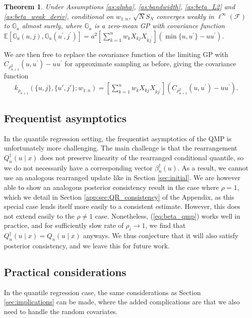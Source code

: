 \documentclass[11pt,a4paper]{article}
\newtheorem{theorem}{Theorem}%
\newcommand{\E}{\mathbb{E}}
\begin{document}
\begin{theorem}\label{th:reg_gp}
   Under {Assumptions \ref{as:alpha}}, {\ref{as:bandwidth}},  {\ref{as:beta_L2}} and {\ref{as:beta_weak_deriv}}, conditional on $w_{1:n}$, $\sqrt{N}S_{N}$ converges weakly in $\ell^{\infty}(\mathcal{F})$ to $\mathbb{G}_{a}$ almost surely, where $\mathbb{G}_{a}$ is a zero-mean GP with covariance function
    $\E[\mathbb{G}_{a}(u,j), \mathbb{G}_{a}(u^{\prime}, j^{\prime})] = a^{2}\left[\sum_{k=1}^{n}w_{k}X_{kj}X_{kj^{\prime}}\right](\min\{u,u^{\prime}\} - uu^{\prime})$.
\end{theorem}
We are then free to replace the covariance function of the limiting GP with $C_{\rho_{n+1}^2}(u,u^{\prime}) - uu^{\prime}$ for approximate sampling as before, giving the covariance function 
\begin{align}\label{eq:reg_kernel}
k_{\rho_{n+1}}(\{u,j\}, \{u',j'\}; w_{1:n}) = \left[\sum_{k=1}^{n}w_{k}X_{kj}X_{kj^{\prime}}\right]\left(C_{\rho_{n+1}^2}(u,u^{\prime}) - uu^{\prime}\right).
\end{align}


\subsection{Frequentist asymptotics}\label{sec:reg_consistency}
In the quantile regression setting, the frequentist asymptotics of the QMP is unfortunately more challenging. The main challenge is that the rearrangement $Q_n^{\dagger}(u \mid x)$ does not preserve linearity of the rearranged conditional quantile, so we do not necessarily have a corresponding vector $\beta_n^{\dagger}(u)$. As a result, we cannot use an analogous rearranged update like in Section \ref{sec:initial}. We are however able to show an analogous posterior consistency result in the case where $\rho = 1$, which we detail in Section \ref{app:sec:QR_consistency} of the Appendix, as this special case lends itself more easily to a consistent estimate. However, this does not extend easily to the $\rho \neq 1$ case. Nonetheless, (\ref{eq:beta_qmp}) works well in practice, and for sufficiently slow rate of $\rho_i \to 1$, we find that $Q_n^{\dagger}(u \mid x) = Q_n(u \mid x)$ anyways. We thus conjecture that it will also satisfy posterior consistency, and we leave this for future work. 

\subsection{Practical considerations}
In the quantile regression case, the same considerations as Section \ref{sec:implications} can be made, where the added complications are that we also need to handle the random covariates.
\end{document}

